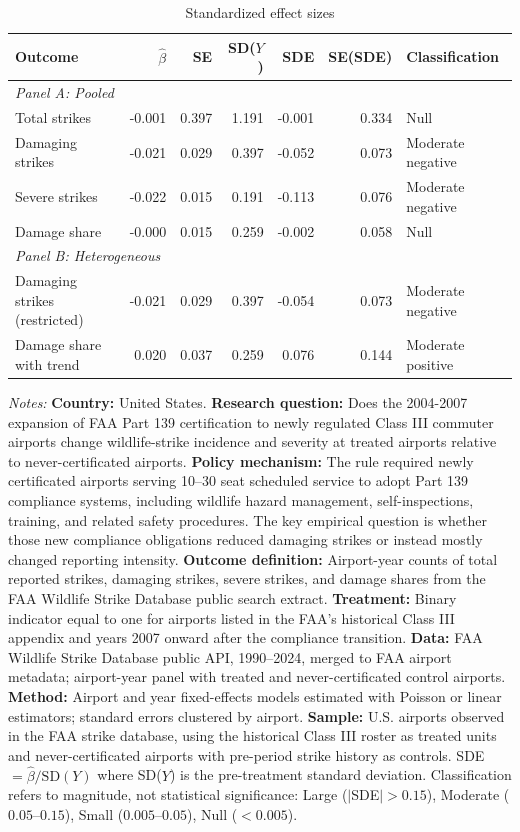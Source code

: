 \begin{table}[!htbp]\centering
\scriptsize
\caption{Standardized effect sizes}\label{tab:F1}
\begin{tabular}{lrrrrrl}
\toprule
Outcome & $\hat{\beta}$ & SE & SD($Y$) & SDE & SE(SDE) & Classification \\
\midrule
\multicolumn{7}{l}{\textit{Panel A: Pooled}} \\
Total strikes & -0.001 & 0.397 & 1.191 & -0.001 & 0.334 & Null \\
Damaging strikes & -0.021 & 0.029 & 0.397 & -0.052 & 0.073 & Moderate negative \\
Severe strikes & -0.022 & 0.015 & 0.191 & -0.113 & 0.076 & Moderate negative \\
Damage share & -0.000 & 0.015 & 0.259 & -0.002 & 0.058 & Null \\
\midrule
\multicolumn{7}{l}{\textit{Panel B: Heterogeneous}} \\
Damaging strikes (restricted) & -0.021 & 0.029 & 0.397 & -0.054 & 0.073 & Moderate negative \\
Damage share with trend & 0.020 & 0.037 & 0.259 & 0.076 & 0.144 & Moderate positive \\
\bottomrule
\end{tabular}
\begin{minipage}{0.95\textwidth}\footnotesize
\textit{Notes:} \textbf{Country:} United States. \textbf{Research question:} Does the 2004-2007 expansion of FAA Part 139 certification to newly regulated Class III commuter airports change wildlife-strike incidence and severity at treated airports relative to never-certificated airports. \textbf{Policy mechanism:} The rule required newly certificated airports serving 10--30 seat scheduled service to adopt Part 139 compliance systems, including wildlife hazard management, self-inspections, training, and related safety procedures. The key empirical question is whether those new compliance obligations reduced damaging strikes or instead mostly changed reporting intensity. \textbf{Outcome definition:} Airport-year counts of total reported strikes, damaging strikes, severe strikes, and damage shares from the FAA Wildlife Strike Database public search extract. \textbf{Treatment:} Binary indicator equal to one for airports listed in the FAA's historical Class III appendix and years 2007 onward after the compliance transition. \textbf{Data:} FAA Wildlife Strike Database public API, 1990--2024, merged to FAA airport metadata; airport-year panel with treated and never-certificated control airports. \textbf{Method:} Airport and year fixed-effects models estimated with Poisson or linear estimators; standard errors clustered by airport. \textbf{Sample:} U.S. airports observed in the FAA strike database, using the historical Class III roster as treated units and never-certificated airports with pre-period strike history as controls. SDE $= \hat{\beta} / \text{SD}(Y)$ where SD($Y$) is the pre-treatment standard deviation. Classification refers to magnitude, not statistical significance: Large ($|$SDE$| > 0.15$), Moderate ($0.05$--$0.15$), Small ($0.005$--$0.05$), Null ($< 0.005$).\end{minipage}
\end{table}
